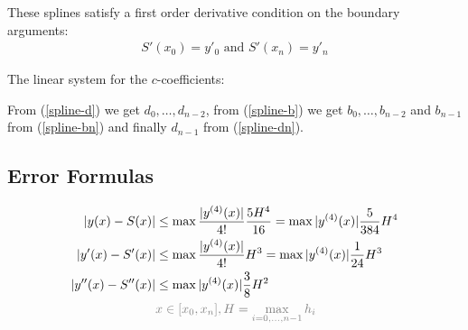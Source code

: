 These splines satisfy a first order derivative condition on the boundary arguments:
\begin{align*}
    S'(x_0)=y'_0\text{ and }S'(x_n)=y'_n
\end{align*}

The linear system for the $c$-coefficients:

From (\ref{spline-d}) we get $d_0,\ldots,d_{n-2}$,
from (\ref{spline-b}) we get $b_0,\ldots,b_{n-2}$ and $b_{n-1}$ from (\ref{spline-bn})
and finally $d_{n-1}$ from (\ref{spline-dn}).

\subsection{Error Formulas}
\begin{align*}
    |y(x)-S(x)| & \leq\max\frac{|y^{(4)}(x)|}{4!}\frac{5H^4}{16} = \max |y^{(4)}(x)|\frac{5}{384}H^4 \\
    |y'(x)-S'(x)| & \leq\max\frac{|y^{(4)}(x)|}{4!}H^3 = \max |y^{(4)}(x)|\frac{1}{24}H^3 \\
    |y''(x)-S''(x)| & \leq\max|y^{(4)}(x)|\frac{3}{8}H^2 \\
    & {\color{gray} x\in [x_0,x_n], H = \max_{i=0,\ldots,n-1}h_i}
\end{align*}

